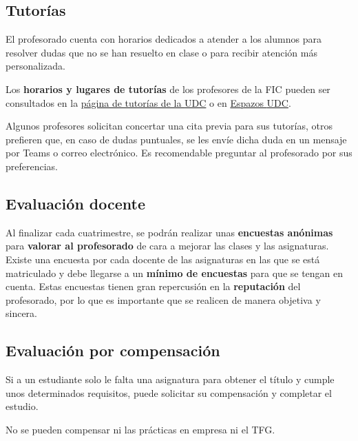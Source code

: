 \subsection{Tutorías} 

El profesorado cuenta con horarios dedicados a atender a los alumnos para resolver dudas que no se han resuelto en clase o para recibir atención más personalizada.  

Los \textbf{horarios y lugares de tutorías} de los profesores de la \acrshort{FIC} pueden ser consultados en la \href{https://www.udc.es/es/centros_departamentos_servizos/centros/titorias/?codigo=614}{página de tutorías de la \acrshort{UDC}} o en \href{https://espazos.udc.es/centers/614/tutorials}{Espazos \acrshort{UDC}}.

\begin{infoBox}
    Algunos profesores solicitan concertar una cita previa para sus tutorías, otros prefieren que, en caso de dudas puntuales, se les envíe dicha duda en un mensaje por Teams o correo electrónico. Es recomendable preguntar al profesorado por sus preferencias.     
\end{infoBox}
 
\subsection{Evaluación docente}

Al finalizar cada cuatrimestre, se podrán realizar unas \textbf{encuestas anónimas} para \textbf{valorar al profesorado} de cara a mejorar las clases y las asignaturas. Existe una encuesta por cada docente de las asignaturas en las que se está matriculado y debe llegarse a un \textbf{mínimo de encuestas} para que se tengan en cuenta. Estas encuestas tienen gran repercusión en la \textbf{reputación} del profesorado, por lo que es importante que se realicen de manera objetiva y sincera. 

\subsection{Evaluación por compensación}

Si a un estudiante solo le falta una asignatura para obtener el título y cumple unos determinados requisitos, puede solicitar su compensación y completar el estudio.

\begin{infoBox}
    No se pueden compensar ni las prácticas en empresa ni el \acrshort{TFG}.
\end{infoBox}
